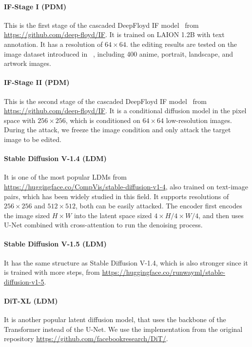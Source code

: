 \paragraph{IF-Stage I (PDM)} This is the first stage of the cascaded DeepFloyd IF model~\cite{deepfloyd} from \url{https://github.com/deep-floyd/IF}. It is trained on LAION 1.2B with text annotation. It has a resolution of $64\times 64$. the editing results are tested on the image dataset introduced in ~\cite{sdsattack}, including 400 anime, portrait, landscape, and artwork images.

\paragraph{IF-Stage II (PDM)} This is the second stage of the cascaded DeepFloyd IF model~\cite{deepfloyd} from \url{https://github.com/deep-floyd/IF}. It is a conditional diffusion model in the pixel space with $256\times 256$, which is conditioned on $64\times 64$ low-resolution images. During the attack, we freeze the image condition and only attack the target image to be edited.


\paragraph{Stable Diffusion V-1.4 (LDM)}
It is one of the most popular LDMs from \url{https://huggingface.co/CompVis/stable-diffusion-v1-4}, also trained on text-image pairs, which has been widely studied in this field. It supports resolutions of $256\times 256$ and $512\times 512$, both can be easily attacked. The encoder first encodes the image sized $H\times W$ into the latent space sized $4\times H/4 \times W/4$, and then uses U-Net combined with cross-attention to run the denoising process.

\paragraph{Stable Diffusion V-1.5 (LDM)}
It has the same structure as Stable Diffusion V-1.4, which is also stronger since it is trained with more steps, from \url{https://huggingface.co/runwayml/stable-diffusion-v1-5}.

\paragraph{DiT-XL (LDM)} It is another popular latent diffusion model, that uses the backbone of the Transformer instead of the U-Net. We use the implementation from the original repository \url{https://github.com/facebookresearch/DiT/}. 



